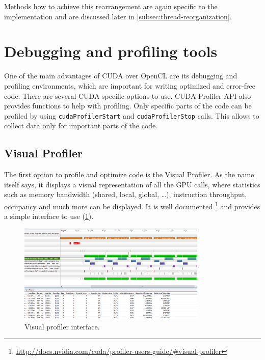 Methods how to achieve this rearrangement are again specific to the implementation and are discussed later in \ref{subsec:thread-reorganization}.

\section{Debugging and profiling tools}

One of the main advantages of CUDA over OpenCL are its debugging and profiling environments, which are important for writing optimized and error-free code. There are several CUDA-specific options to use. CUDA Profiler API also provides functions to help with profiling. Only specific parts of the code can be profiled by using \verb|cudaProfilerStart| and \verb|cudaProfilerStop| calls. This allows to collect data only for important parts of the code.

\subsection{Visual Profiler}\label{subsec:proftools-visual-profiler}

The first option to profile and optimize code is the Visual Profiler. As the name itself says, it displays a visual representation of all the GPU calls, where statistics such as memory bandwidth (shared, local, global, \dots), instruction throughput, occupancy and much more can be displayed. It is well documented \footnote{\url{http://docs.nvidia.com/cuda/profiler-users-guide/\#visual-profiler}} and provides a simple interface to use (\ref{fig:visual-profiler}). 

\begin{figure}[h]
	\begin{center}
	\includegraphics[width=0.8\textwidth]{fig/visual_profiler.jpg}
	\caption{Visual profiler interface.}
	\label{fig:visual-profiler}
	\end{center}
\end{figure}


